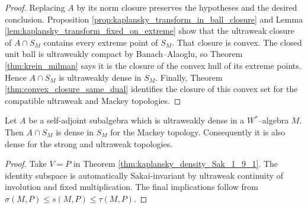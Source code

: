 \begin{proof}
  \leanok
  Replacing $A$ by its norm closure preserves the hypotheses and the desired conclusion.
  Proposition \ref{prop:kaplansky_transform_in_ball_closure} and Lemma
  \ref{lem:kaplansky_transform_fixed_on_extreme} show that the ultraweak closure of
  $A\cap S_M$ contains every extreme point of $S_M$.  That closure is convex.  The closed unit ball
  is ultraweakly compact by Banach--Alaoglu, so Theorem \ref{thm:krein_milman} says it is the
  closure of the convex hull of its extreme points.  Hence $A\cap S_M$ is ultraweakly dense in
  $S_M$.  Finally, Theorem \ref{thm:convex_closure_same_dual} identifies the closure of this convex
  set for the compatible ultraweak and Mackey topologies.
\end{proof}

\begin{corollary}
  \label{cor:kaplansky_density_ultraweak}
  \leanok
  Let $A$ be a self-adjoint subalgebra which is ultraweakly dense in a $W^{*}$--algebra $M$.
  Then $A\cap S_M$ is dense in $S_M$ for the Mackey topology.  Consequently it is also dense for
  the strong and ultraweak topologies.
\end{corollary}

\begin{proof}
  \leanok
  Take $V=P$ in Theorem \ref{thm:kaplansky_density_Sak_1_9_1}.  The identity subspace is
  automatically Sakai-invariant by ultraweak continuity of involution and fixed multiplication.
  The final implications follow from
  $\sigma(M,P)\leq s(M,P)\leq\tau(M,P)$.
\end{proof}
